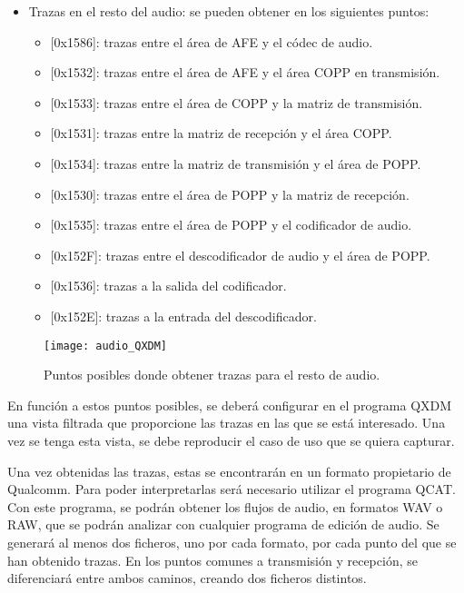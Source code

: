 \begin{itemize}
	\item{Trazas en el resto del audio: se pueden obtener en los siguientes puntos:}
	\begin{itemize}
		\item{[0x1586]: trazas entre el área de \gls{AFE} y el códec de audio.}
		\item{[0x1532]: trazas entre el área de \gls{AFE} y el área \gls{COPP} en transmisión.}
		\item{[0x1533]: trazas entre el área de \gls{COPP} y la matriz de transmisión.}
		\item{[0x1531]: trazas entre la matriz de recepción y el área \gls{COPP}.}
		\item{[0x1534]: trazas entre la matriz de transmisión y el área de \gls{POPP}.}
		\item{[0x1530]: trazas entre el área de \gls{POPP} y la matriz de recepción.}
		\item{[0x1535]: trazas entre el área de \gls{POPP} y el codificador de audio.}
		\item{[0x152F]: trazas entre el descodificador de audio y el área de \gls{POPP}.}
		\item{[0x1536]: trazas a la salida del codificador.}
		\item{[0x152E]: trazas a la entrada del descodificador.}
	\end{itemize}
\end{itemize}

\begin{figure}[H]
	\centering
	\texttt{[image: audio\_QXDM]}
	\caption{Puntos posibles donde obtener trazas para el resto de audio.} 
	\label{fig:audio_qxdm}
\end{figure}

En función a estos puntos posibles, se deberá configurar en el programa \gls{QXDM} una vista filtrada que proporcione las trazas en las que se está interesado. Una vez se tenga esta vista, se debe reproducir el caso de uso que se quiera capturar.

Una vez obtenidas las trazas, estas se encontrarán en un formato propietario de Qualcomm. Para poder interpretarlas será necesario utilizar el programa \gls{QCAT}. Con este programa, se podrán obtener los flujos de audio, en formatos WAV o RAW, que se podrán analizar con cualquier programa de edición de audio. Se generará al menos dos ficheros, uno por cada formato, por cada punto del que se han obtenido trazas. En los puntos comunes a transmisión y recepción, se diferenciará entre ambos caminos, creando dos ficheros distintos.

